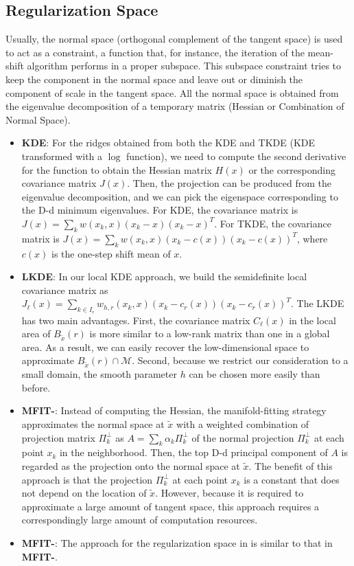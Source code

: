 \documentclass[aos,preprint]{imsart}
\theoremstyle{remark}
\begin{document}
\subsection{Regularization Space}
Usually, the normal space (orthogonal complement of the tangent space) is used to act as a constraint, a function that, for instance, the iteration of the mean-shift algorithm performs in a proper subspace. This subspace constraint tries to keep the component in the normal space and leave out or diminish the component of scale in the tangent space. All the normal space is obtained from the eigenvalue decomposition of a temporary matrix (Hessian or Combination of Normal Space).
\begin{itemize}
\item{\bf KDE}:  For the ridges obtained from both the KDE and TKDE (KDE transformed with a $\log$ function), we need to compute the second derivative for the function to obtain the Hessian matrix $H(x)$ or the corresponding covariance matrix $J(x)$. Then, the projection can be produced from the eigenvalue decomposition, and we can pick the eigenspace corresponding to the D-d minimum eigenvalues. For KDE, the covariance matrix is $J(x) = \sum_k w(x_k,x)(x_k-x)(x_k-x)^T$. For TKDE, the covariance matrix is $J(x) = \sum_k w(x_k,x)(x_k-c(x))(x_k-c(x))^T$, where $c(x)$ is the one-step shift mean of $x$.

\item{\bf LKDE}: In our local KDE approach, we build the semidefinite local covariance matrix as $J_{\ell}(x)=\sum_{k\in I_r} w_{h,r}(x_k, x)(x_k-c_r(x))(x_k-c_r(x))^T$. The LKDE has two main advantages. First, the covariance matrix $C_{\ell}(x)$ in the local area of $B_{\tilde{x}}(r)$ is more similar to a low-rank matrix than one in a global area. As a result, we can easily recover the low-dimensional space to approximate $B_{\tilde{x}}(r)\cap \mathcal M$. Second, because we restrict our consideration to a small domain, the smooth parameter $h$ can be chosen more easily than before.

\item{\bf MFIT-}: Instead of computing the Hessian, the manifold-fitting strategy approximates the normal space at $\tilde{x}$ with a weighted combination of projection matrix $\Pi_k^{\perp}$ as $A = \sum_k \alpha_k \Pi_k^{\perp}$ of the normal projection $\Pi_k^{\perp}$ at each point $x_k$ in the neighborhood. Then, the top D-d principal component of $A$ is regarded as the projection onto the normal space at $\tilde{x}$. The benefit of this approach is that the projection $\Pi_k^{\perp}$ at each point $x_k$ is a constant that does not depend on the location of $\tilde{x}$. However, because it is required to approximate a large amount of tangent space, this approach requires a correspondingly large amount of computation resources.

\item{\bf MFIT-}: The approach for the regularization space in \cite{yao2019manifold}  is similar to that in {\bf MFIT-}.

\end{itemize}
\end{document}
